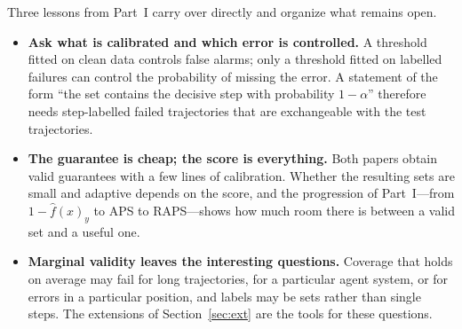 \documentclass[11pt]{article}
\theoremstyle{definition}
\newcommand{\fhat}{\hat{f}}
\begin{document}
Three lessons from Part~I carry over directly and organize what remains open.
\begin{keybox}
\begin{itemize}[leftmargin=1.5em]
\item \textbf{Ask what is calibrated and which error is controlled.} A threshold fitted on clean data controls false alarms; only a threshold fitted on labelled failures can control the probability of missing the error. A statement of the form ``the set contains the decisive step with probability $1-\alpha$'' therefore needs step-labelled failed trajectories that are exchangeable with the test trajectories.
\item \textbf{The guarantee is cheap; the score is everything.} Both papers obtain valid guarantees with a few lines of calibration. Whether the resulting sets are small and adaptive depends on the score, and the progression of Part~I---from $1-\fhat(x)_y$ to APS to RAPS---shows how much room there is between a valid set and a useful one.
\item \textbf{Marginal validity leaves the interesting questions.} Coverage that holds on average may fail for long trajectories, for a particular agent system, or for errors in a particular position, and labels may be sets rather than single steps. The extensions of Section~\ref{sec:ext} are the tools for these questions.
\end{itemize}
\end{keybox}
\end{document}
